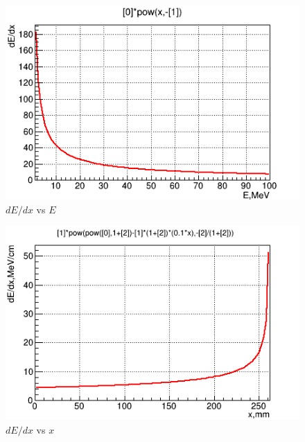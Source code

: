 \documentclass[english]{article}
\makeatletter
\def\ScaleIfNeeded{%
\ifdim\Gin@nat@width>\linewidth
\linewidth
\else
\Gin@nat@width
\fi
}
\makeatother
\begin{document}
\begin{figure}[h]
\centering
\begin{minipage}[t]{1.0 \linewidth}
\includegraphics[width=\ScaleIfNeeded]{dEdx_vs_E}
\caption{$dE/dx$ vs $E$}
\label{fig:dEdx_vs_E}
\end{minipage}
\end{figure}

\begin{figure}[h]
\centering
\begin{minipage}[t]{1.0 \linewidth}
\includegraphics[width=\ScaleIfNeeded]{dEdx_vs_x}
\caption{$dE/dx$ vs $x$}
\label{fig:dEdx_vs_x}
\end{minipage}
\end{figure}
\end{document}
